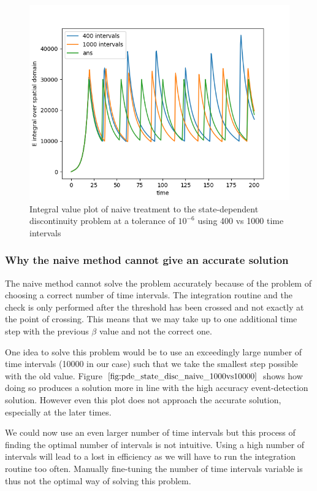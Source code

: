 \documentclass{article}
\begin{document}
\begin{figure}[H]
\centering
\includegraphics[width=0.7\linewidth]{./figures/pde_state_disc_naive_400vs1000}
\caption{Integral value plot of naive treatment to the state-dependent discontinuity problem at a tolerance of $10^{-6}$ using 400 vs 1000 time intervals}
\label{fig:pde_state_disc_naive_400vs1000}
\end{figure}

\subsubsection{Why the naive method cannot give an accurate solution}
\label{subsubsection:pde_state_naive_always_inaccurate}
The naive method cannot solve the problem accurately because of the problem of choosing a correct number of time intervals. The integration routine and the check is only performed after the threshold has been crossed and not exactly at the point of crossing. This means that we may take up to one additional time step with the previous $\beta$ value and not the correct one.

One idea to solve this problem would be to use an exceedingly large number of time intervals (10000 in our case) such that we take the smallest step possible with the old value. Figure $\ref{fig:pde_state_disc_naive_1000vs10000}$ shows how doing so produces a solution more in line with the high accuracy event-detection solution. However even this plot does not approach the accurate solution, especially at the later times. 

We could now use an even larger number of time intervals but this process of finding the optimal number of intervals is not intuitive. Using a high number of intervals will lead to a lost in efficiency as we will have to run the integration routine too often. Manually fine-tuning the number of time intervals variable is thus not the optimal way of solving this problem. 
\end{document}
